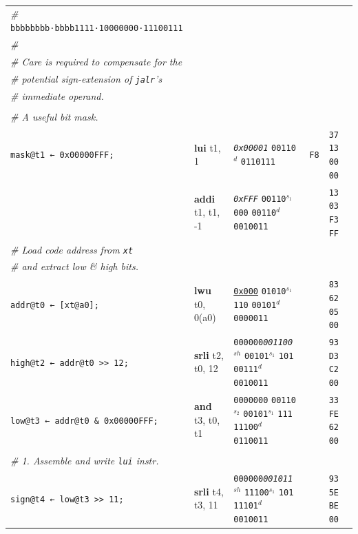 \documentclass[a4paper,12pt,final]{article}
\begin{document}
\begin{table}[!htbp]
\begin{adjustwidth}{-1cm}{-1cm}
\begin{center}
\begin{tabular}{l|ll|l|l}
\emph{\#}\hspace{1.053000em}​\texttt{bbbbbbbb·bbbb1111·10000000·11100111} &  &  &  & \\[0pt]
\emph{\#} &  &  &  & \\[0pt]
\emph{\# Care is required to compensate for the} &  &  &  & \\[0pt]
\emph{\# potential sign-extension of \texttt{jalr}​'s} &  &  &  & \\[0pt]
\emph{\# immediate operand.} &  &  &  & \\[0pt]
 &  &  &  & \\[0pt]
\emph{\# A useful bit mask.} &  &  &  & \\[0pt]
\texttt{mask@t1 ← 0x00000FFF;} & \textbf{lui} t1, 1 & \emph{\texttt{0x00001}}                                                  \texttt{00110}​\(^{d}\)  \texttt{0110111} & \texttt{F8} & \texttt{37 13 00 00}\\[0pt]
 & \textbf{addi} t1, t1, -1 & \emph{\texttt{0xFFF}}                    \texttt{00110}​\(^{s_{1}}\) \texttt{000} \texttt{00110}​\(^{d}\)  \texttt{0010011} &  & \texttt{13 03 F3 FF}\\[0pt]
\emph{\# Load code address from \texttt{xt}} &  &  &  & \\[0pt]
\emph{\# and extract low \& high bits.} &  &  &  & \\[0pt]
\texttt{addr@t0 ← [xt@a0];} & \textbf{lwu} t0, 0(a0) & \uline{\texttt{0x000}}                    \texttt{01010}​\(^{s_{1}}\) \texttt{110} \texttt{00101}​\(^{d}\)  \texttt{0000011} &  & \texttt{83 62 05 00}\\[0pt]
\texttt{high@t2 ← addr@t0 >{}>{} 12;} & \textbf{srli} t2, t0, 12 & \texttt{000000}​\emph{\texttt{001100}}​\(^{sh}\)         \texttt{00101}​\(^{s_{1}}\) \texttt{101} \texttt{00111}​\(^{d}\)  \texttt{0010011} &  & \texttt{93 D3 C2 00}\\[0pt]
\texttt{low@t3 ← addr@t0 \& 0x00000FFF;} & \textbf{and} t3, t0, t1 & \texttt{0000000} \texttt{00110}​\(^{s_{2}}\) \texttt{00101}​\(^{s_{1}}\) \texttt{111} \texttt{11100}​\(^{d}\)  \texttt{0110011} &  & \texttt{33 FE 62 00}\\[0pt]
 &  &  &  & \\[0pt]
\emph{\# 1. Assemble and write \texttt{lui} instr.} &  &  &  & \\[0pt]
\texttt{sign@t4 ← low@t3 >{}>{} 11;} & \textbf{srli} t4, t3, 11 & \texttt{000000}​\emph{\texttt{001011}}​\(^{sh}\)         \texttt{11100}​\(^{s_{1}}\) \texttt{101} \texttt{11101}​\(^{d}\)  \texttt{0010011} &  & \texttt{93 5E BE 00}\\[0pt]

\end{tabular}
\end{center}
\end{adjustwidth}
\end{table}
\end{document}
